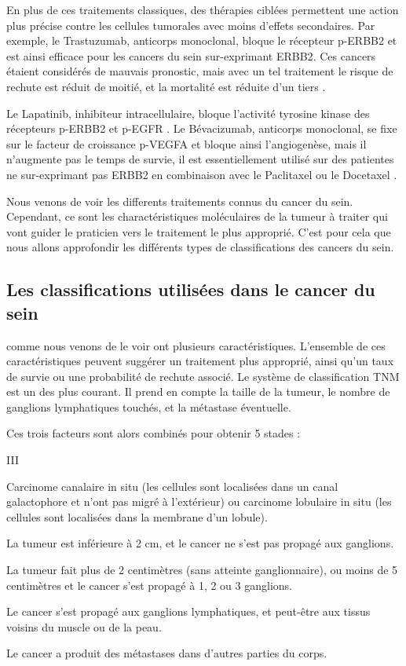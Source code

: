 			En plus de ces traitements classiques, des thérapies ciblées permettent une action plus précise contre les cellules tumorales avec moins d'effets secondaires.
			Par exemple, le Trastuzumab, anticorps monoclonal, bloque le récepteur \acs{p-ERBB2} et est ainsi efficace pour les cancers du sein sur-exprimant \acs{ERBB2}.
			Ces cancers étaient considérés de mauvais pronostic, mais avec un tel traitement le risque de rechute est réduit de moitié, et la mortalité est réduite d'un tiers \citep{Hudis2007}.

			Le Lapatinib, inhibiteur intracellulaire, bloque l'activité tyrosine kinase des récepteurs \acs{p-ERBB2} et \acs{p-EGFR} \citep{Burris2004,Higa2007}.
			Le Bévacizumab, anticorps monoclonal, se fixe sur le facteur de croissance \acs{p-VEGFA} et bloque ainsi l'angiogenèse, mais il n'augmente pas le temps de survie, il est essentiellement utilisé sur des patientes ne sur-exprimant pas \acs{ERBB2} en combinaison avec le Paclitaxel \citep{Miller2007a, Montero2012} ou le Docetaxel \citep{Miles2010}.

			Nous venons de voir les differents traitements connus du cancer du sein.
			Cependant, ce sont les charactéristiques moléculaires de la tumeur à traiter qui vont guider le praticien vers le traitement le plus approprié.
			C'est pour cela que nous allons approfondir les différents types de classifications des cancers du sein.

		\subsection{\textcolor{myred}{Les classifications utilisées dans le cancer du sein}}
			 comme nous venons de le voir ont plusieurs caractéristiques.
			L'ensemble de ces caractéristiques peuvent suggérer un traitement plus approprié, ainsi qu'un taux de survie ou une probabilité de rechute associé.
			Le système de classification \ac{TNM} est un des plus courant.
			Il prend en compte la taille de la tumeur, le nombre de ganglions lymphatiques touchés, et la métastase éventuelle.

			Ces trois facteurs sont alors combinés pour obtenir 5 stades :
			\begin{mylist}{III}
				\item [0]   Carcinome canalaire in situ (les cellules sont localisées dans un canal galactophore et n'ont pas migré à l'extérieur) ou carcinome lobulaire in situ (les cellules sont localisées dans la membrane d'un lobule).
				\item [I]   La tumeur est inférieure à 2 cm, et le cancer ne s'est pas propagé aux ganglions.
				\item [II]  La tumeur fait plus de 2 centimètres (sans atteinte ganglionnaire), ou moins de 5 centimètres et le cancer s'est propagé à 1, 2 ou 3 ganglions.
				\item [III] Le cancer s'est propagé aux ganglions lymphatiques, et peut-être aux tissus voisins du muscle ou de la peau.
				\item [IV]  Le cancer a produit des métastases dans d'autres parties du corps.
			\end{mylist}
			\vspace{1.5em}

